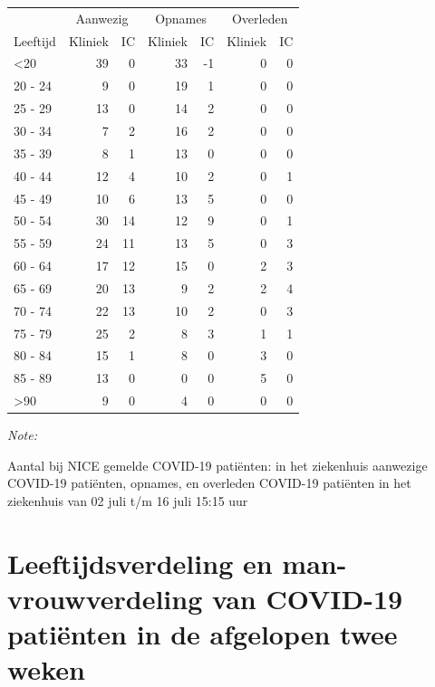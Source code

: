 \documentclass[
  english,
  man,floatsintext]{apa6}
\begin{document}
\begin{table}
\centering\begingroup\fontsize{10}{12}\selectfont

\begin{threeparttable}
\begin{tabular}{lrrrrrr}
\toprule
\multicolumn{1}{c}{ } & \multicolumn{2}{c}{Aanwezig} & \multicolumn{2}{c}{Opnames} & \multicolumn{2}{c}{Overleden} \\
\cmidrule(l{3pt}r{3pt}){2-3} \cmidrule(l{3pt}r{3pt}){4-5} \cmidrule(l{3pt}r{3pt}){6-7}
Leeftijd & Kliniek & IC & Kliniek & IC & Kliniek & IC\\
\midrule
<20 & 39 & 0 & 33 & -1 & 0 & 0\\
20 - 24 & 9 & 0 & 19 & 1 & 0 & 0\\
25 - 29 & 13 & 0 & 14 & 2 & 0 & 0\\
30 - 34 & 7 & 2 & 16 & 2 & 0 & 0\\
35 - 39 & 8 & 1 & 13 & 0 & 0 & 0\\
40 - 44 & 12 & 4 & 10 & 2 & 0 & 1\\
45 - 49 & 10 & 6 & 13 & 5 & 0 & 0\\
50 - 54 & 30 & 14 & 12 & 9 & 0 & 1\\
55 - 59 & 24 & 11 & 13 & 5 & 0 & 3\\
60 - 64 & 17 & 12 & 15 & 0 & 2 & 3\\
65 - 69 & 20 & 13 & 9 & 2 & 2 & 4\\
70 - 74 & 22 & 13 & 10 & 2 & 0 & 3\\
75 - 79 & 25 & 2 & 8 & 3 & 1 & 1\\
80 - 84 & 15 & 1 & 8 & 0 & 3 & 0\\
85 - 89 & 13 & 0 & 0 & 0 & 5 & 0\\
>90 & 9 & 0 & 4 & 0 & 0 & 0\\
\bottomrule
\end{tabular}
\begin{tablenotes}
\item \textit{Note: } 
\item Aantal bij NICE gemelde COVID-19 patiënten: in het ziekenhuis aanwezige COVID-19 patiënten, opnames, en overleden COVID-19 patiënten in het ziekenhuis van 02 juli t/m 16 juli 15:15 uur
\end{tablenotes}
\end{threeparttable}
\endgroup{}
\end{table}

\newpage

\hypertarget{leeftijdsverdeling-en-man-vrouwverdeling-van-covid-19-patiuxebnten-in-de-afgelopen-twee-weken}{%
\section{Leeftijdsverdeling en man-vrouwverdeling van COVID-19 patiënten in de afgelopen twee weken}\label{leeftijdsverdeling-en-man-vrouwverdeling-van-covid-19-patiuxebnten-in-de-afgelopen-twee-weken}}
\end{document}
